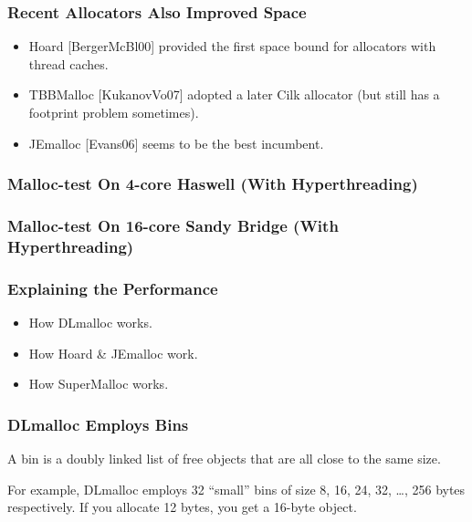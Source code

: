 \documentclass[xcolor=dvipsnames,14pt]{beamer}
\begin{document}
\begin{frame}[fragile]
\frametitle{Recent Allocators Also Improved Space}

\begin{itemize}
\item Hoard [BergerMcBl00] provided the first space bound for allocators
with thread caches.
\item TBBMalloc [KukanovVo07] adopted a later Cilk allocator (but still has a footprint problem sometimes).
\item JEmalloc [Evans06] seems to be the best incumbent.
\end{itemize}


\end{frame}

\begin{frame}
\frametitle{Malloc-test On 4-core Haswell (With Hyperthreading)}


\end{frame}
\begin{frame}
\frametitle{Malloc-test On 16-core Sandy Bridge (With Hyperthreading)}


\end{frame}

\begin{frame}
\frametitle{Explaining the Performance}

\begin{itemize}
\item How DLmalloc works.
\item How Hoard \& JEmalloc work.
\item How SuperMalloc works.
\end{itemize}

\end{frame}

\begin{frame}
\frametitle{DLmalloc Employs Bins}
A bin is a doubly linked list of free objects that are all close to the same size.

\vfill

For example, DLmalloc employs 32 ``small'' bins of size 8, 16, 24, 32,
\ldots, 256 bytes respectively.  If you allocate 12 bytes, you get a 16-byte object.

\end{frame}
\end{document}
